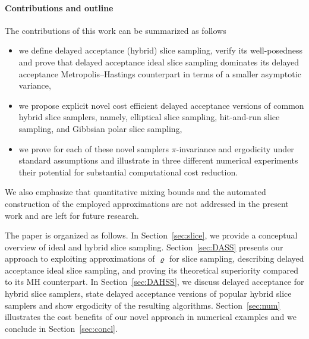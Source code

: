 \documentclass[sn-mathphys-num]{sn-jnl}%
\theoremstyle{thmstyleone}%
\theoremstyle{thmstyletwo}%
\theoremstyle{thmstylethree}%
\newcommand{\change}[1]{\bgroup\color{black}#1\egroup}    %
\begin{document}
\change{\paragraph{Contributions and outline} 
The contributions of this work can be summarized as follows
\begin{itemize}
    \item 
    we define delayed acceptance (hybrid) slice sampling, verify its well-posedness and prove that delayed acceptance ideal slice sampling dominates its delayed acceptance Metropolis--Hastings counterpart in terms of a smaller asymptotic variance,   
    \item 
    we propose explicit novel cost efficient delayed acceptance versions of common hybrid slice samplers, namely, elliptical slice sampling, hit-and-run slice sampling, and Gibbsian polar slice sampling,
    \item 
    we prove for each of these novel samplers $\pi$-invariance and ergodicity under standard assumptions and illustrate in three different numerical experiments their potential for substantial computational cost reduction.
\end{itemize}
We also emphasize that quantitative mixing bounds and the automated construction of the employed approximations are not addressed in the present work and are left for future research.}

The paper is organized as follows. 
In Section~\ref{sec:slice}, we provide a \change{conceptual} overview of ideal and hybrid slice sampling. 
Section~\ref{sec:DASS} presents our approach to exploiting approximations of $\varrho$ for slice sampling, 
describing delayed acceptance ideal slice sampling, and proving its theoretical superiority compared to its MH counterpart.
In Section~\ref{sec:DAHSS}, we discuss delayed acceptance for hybrid slice samplers, state delayed acceptance versions of popular hybrid slice samplers and show ergodicity of the resulting algorithms.
Section~\ref{sec:num} illustrates the cost benefits of our novel approach in numerical examples and we conclude in Section~\ref{sec:concl}.
\end{document}
